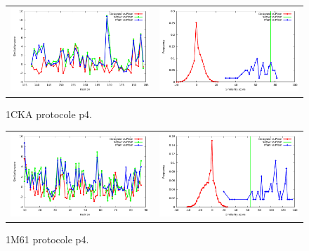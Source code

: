 \documentclass[a4paper,12pt]{article}
\begin{document}
   \begin{figure}[t]
     \centering
     \begin{tabular}{cc}
       \includegraphics[width=8.45cm]{gen_08032012/1CKA/p4/similarity_bypos.pdf} &
       \includegraphics[width=8.45cm]{gen_08032012/1CKA/p4/similarity_byseq_frequency.pdf} \\
     \end{tabular}
     
     \caption{1CKA protocole p4.}
     \label{1CKA}
   \end{figure}
   \begin{figure}[t]
     \centering
     \begin{tabular}{cc}
       \includegraphics[width=8.45cm]{gen_08032012/1M61/p4/similarity_bypos.pdf} &
       \includegraphics[width=8.45cm]{gen_08032012/1M61/p4/similarity_byseq_frequency.pdf} \\
     \end{tabular}
     
     \caption{1M61 protocole p4.}
     \label{1M61}
   \end{figure}
\end{document}
